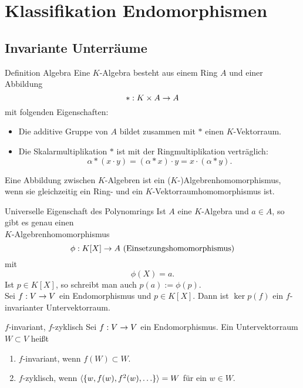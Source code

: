 \documentclass[main.tex]{subfiles}
\begin{document}
\section*{Klassifikation Endomorphismen}
\subsection*{Invariante Unterräume}

\begin{karte}{Definition Algebra}
    Eine \(K\)-Algebra besteht aus einem Ring \(A\) 
    und einer Abbildung 
    \[ * : K\times A \rightarrow A \]
    mit folgenden Eigenschaften:
    \begin{itemize}
        \item Die additive Gruppe von \(A\) bildet 
        zusammen mit \( * \) einen \(K\)-Vektorraum.
        \item Die Skalarmultiplikation \(*\) ist mit der 
        Ringmultiplikation verträglich:
        \[ \alpha * (x \cdot y) = (\alpha * x) \cdot y 
        = x \cdot (\alpha * y). \]
    \end{itemize}
    Eine Abbildung zwischen \(K\)-Algebren ist ein 
    (\(K\)-)Algebrenhomomorphismus, wenn sie gleichzeitig ein Ring- 
    und ein \(K\)-Vektorraumhomomorphismus ist.
\end{karte}

\begin{karte}{Universelle Eigenschaft des Polynomrings}
    Ist \(A\) eine \(K\)-Algebra und \( a\in A \), so gibt 
    es genau einen \\
    \(K\)-Algebrenhomomorphismus 
    \[ \phi : K[X] \rightarrow A \text{ (Einsetzungshomomorphismus)} \] 
    mit 
    \[ \phi(X) = a. \]
    Ist \( p\in K[X] \), so schreibt man auch \( p(a) := \phi(p) \).\\
    Sei \( f : V \rightarrow V \) ein Endomorphismus und \( p\in K[X] \). 
    Dann ist \( \ker p(f) \) ein \( f \)-invarianter Untervektorraum.
\end{karte}

\begin{karte}{\( f \)-invariant, \(f\)-zyklisch}
    Sei \( f : V \rightarrow V \) ein Endomorphismus. Ein Untervektorraum 
    \( W\subset V \) heißt 
    \begin{enumerate}
        \item \( f \)-invariant, wenn \( f(W) \subset W \).
        \item \(f\)-zyklisch, wenn 
        \( \langle \{ w, f(w), f^2(w),\ldots \}\rangle = W \) für 
        ein \( w\in W \).
    \end{enumerate}
\end{karte}
\end{document}

